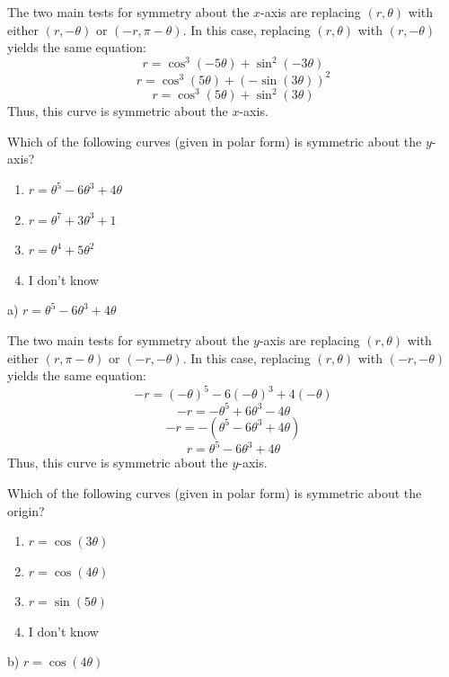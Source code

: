 \documentclass[addpoints,12pt,answers]{exam}
\begin{document}
\begin{questions}
\begin{solution}
    The two main tests for symmetry about the $x$-axis are replacing $(r,\theta)$ with either $(r,-\theta)$ or $(-r,\pi-\theta)$. In this case, replacing $(r,\theta)$ with $(r,-\theta)$ yields the same equation:
    $$r=\cos^3(-5\theta)+\sin^2(-3\theta)$$
    $$r=\cos^3(5\theta)+(-\sin(3\theta))^2$$
    $$r=\cos^3(5\theta)+\sin^2(3\theta)$$
    Thus, this curve is symmetric about the $x$-axis.
  \end{solution}
  \newpage
  \question
  Which of the following curves (given in polar form) is symmetric about the $y$-axis?
  \begin{enumerate}[label=\alph*)]
    \item
    $r=\theta^5-6\theta^3+4\theta$
    \item
    $r=\theta^7+3\theta^3+1$
    \item
    $r=\theta^4+5\theta^2$
    \item
    I don't know
  \end{enumerate}
  \begin{solution}
    a) $r=\theta^5-6\theta^3+4\theta$
    
    The two main tests for symmetry about the $y$-axis are replacing $(r,\theta)$ with either $(r,\pi-\theta)$ or $(-r,-\theta)$. In this case, replacing $(r,\theta)$ with $(-r,-\theta)$ yields the same equation:
    $$-r=(-\theta)^5-6(-\theta)^3+4(-\theta)$$
    $$-r=-\theta^5+6\theta^3-4\theta$$
    $$-r=-(\theta^5-6\theta^3+4\theta)$$
    $$r=\theta^5-6\theta^3+4\theta$$
    Thus, this curve is symmetric about the $y$-axis.
  \end{solution}
  \newpage
  \question
  Which of the following curves (given in polar form) is symmetric about the origin?
  \begin{enumerate}[label=\alph*)]
    \item
    $r=\cos(3\theta)$
    \item
    $r=\cos(4\theta)$
    \item
    $r=\sin(5\theta)$
    \item
    I don't know
  \end{enumerate}
  \begin{solution}
    b) $r=\cos(4\theta)$
    

\end{solution}
\end{questions}
\end{document}
